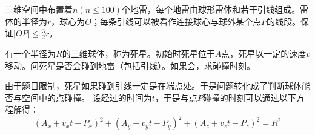 \begin{prob}
	三维空间中布置着$n(n \le 100)$个地雷，每个地雷由球形雷体和若干引线组成。雷体的半径为$r$，球心为$O$；每条引线可以被看作连接球心与球外某个点$P$的线段。保证$|OP| \le \frac{3}{2}r$。\par
	有一个半径为$R$的三维球体，称为死星。初始时死星位于$A$点，死星以一定的速度$v$移动。问死星是否会碰到地雷（包括引线）。如果会，求碰撞时刻。
\end{prob}

\begin{sol}
	由于题目限制，死星如果碰到引线一定是在端点处。于是问题转化成了判断球体能否与空间中的点碰撞。
	设经过的时间为$t$，于是与点$P$碰撞的时刻可以通过以下方程解得：
	\begin{displaymath}
		(A_x+v_xt-P_x)^2 + (A_y+v_yt-P_y)^2 + (A_z+v_zt-P_z)^2 = R^2
	\end{displaymath}
\end{sol}
